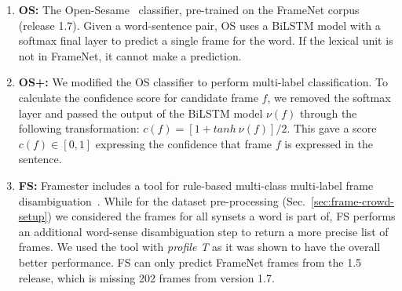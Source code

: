 \begin{enumerate}
    \item \textbf{OS:} The Open-Sesame~\cite{swayamdipta:17} classifier, pre-trained on the FrameNet corpus (release 1.7). Given a word-sentence pair, OS uses a BiLSTM model with a softmax final layer to predict a single frame for the word. If the lexical unit is not in FrameNet, it cannot make a prediction. %
    
    \item \textbf{OS+:} We modified the OS classifier to perform multi-label classification. To calculate the confidence score for candidate frame $f$, we removed the softmax layer and passed the output of the BiLSTM model $\nu(f)$ through the following transformation: $c(f) = [1 + tanh \ \nu(f)] / 2$. This gave a score $c(f) \in [0,1]$ expressing the confidence that frame $f$ is expressed in the sentence.
    
    \item \textbf{FS:} Framester includes a  tool for rule-based multi-class multi-label frame disambiguation~\cite{gangemi2016framester}. While for the dataset pre-processing (Sec.~\ref{sec:frame-crowd-setup}) we considered the frames for all synsets a word is part of, FS performs an additional word-sense disambiguation step %
    to return a more precise list of frames. We used the tool with \textit{profile T} as it was shown to have the overall better performance. FS can only predict FrameNet frames from the 1.5 release, which is missing 202 frames from version 1.7. %
\end{enumerate}

